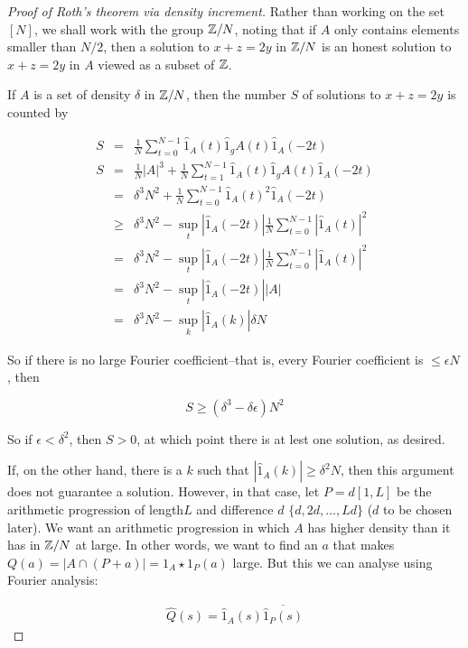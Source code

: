 \documentclass{article}
\theoremstyle{definition}
\theoremstyle{remark}
\numberwithin{equation}{section}
\begin{document}
\begin{proof}[Proof of Roth's theorem via density increment]

  Rather than working on the set $[N]$, we shall work with the group
  $\mathbb{Z}/N$, noting that if $A$ only contains elements smaller than
  $N/2$, then a solution to $x+z=2y$ in $\mathbb{Z}/N$ is an honest solution
  to $x+z=2y$ in $A$ viewed as a subset of $\mathbb{Z}$.  

  If $A$ is a set of density $\delta$ in $\mathbb{Z}/N$, then the number $S$
  of solutions to $x+z=2y$ is counted by

  \begin{eqnarray*}
    S &=& \frac1N \sum_{t=0}^{N-1} \hat 1_A(t)\hat 1_gA(t)\hat 1_A(-2t) \\
    S &=& \frac1N |A|^3 + \frac1N \sum_{t=1}^{N-1} \hat 1_A(t)\hat 1_gA(t)\hat 1_A(-2t) \\
      &=& \delta^3 N^2 + \frac1N \sum_{t=0}^{N-1} \hat 1_A(t)^2\hat 1_A(-2t) \\
      &\geq& \delta^3 N^2 - \sup_t |\hat 1_A(-2t)| \frac1N \sum_{t=0}^{N-1} |\hat 1_A(t)|^2 \\
      &=& \delta^3 N^2 - \sup_t |\hat 1_A(-2t)| \frac1N \sum_{t=0}^{N-1} |\hat 1_A(t)|^2 \\
      &=& \delta^3 N^2 - \sup_t |\hat 1_A(-2t)| |A|\\
      &=& \delta^3 N^2 - \sup_k |\hat 1_A(k)| \delta N
  \end{eqnarray*}

  So if there is no large Fourier coefficient--that is, every Fourier
  coefficient is $\leq \epsilon N$, then
  
  \[S \geq (\delta^3 - \delta\epsilon) N^2\]

  So if $\epsilon < \delta^2$, then $S > 0$, at which point there is at
  lest one solution, as desired.  
  
  If, on the other hand, there is a $k$ such that
  $|\hat 1_A(k)| \geq \delta^2 N$, then this argument does not
  guarantee a solution.  However, in that case, let $P = d[1,L]$ be
  the arithmetic progression of length$L$ and difference $d$
  $\{d, 2d, \ldots ,Ld\}$ ($d$ to be chosen later).  We want an
  arithmetic progression in which $A$ has higher density than it has
  in $\mathbb{Z}/N$ at large.  In other words, we want to find an $a$ that
  makes $Q(a) = |A \cap (P+a)| = 1_A \star 1_P(a)$ large.  But this we
  can analyse using Fourier analysis:
  
  \begin{eqnarray*}
    \hat Q(s) = \hat 1_A(s) \overline{\hat 1_P(s)}
  \end{eqnarray*}
  

\end{proof}
\end{document}

